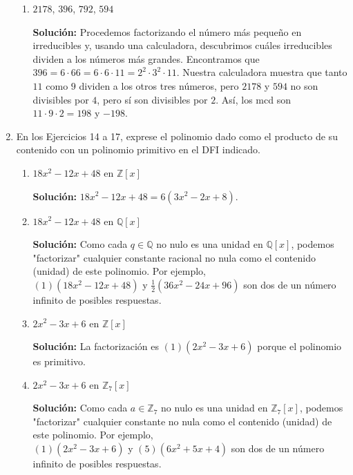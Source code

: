 \begin{enumerate}
\begin{enumerate}
        \item $2178$, $396$, $792$, $594$
        
        \textbf{Solución:} Procedemos factorizando el número más pequeño en irreducibles y, usando una calculadora, descubrimos cuáles irreducibles dividen a los números más grandes. Encontramos que $396 = 6 \cdot 66 = 6 \cdot 6 \cdot 11 = 2^2 \cdot 3^2 \cdot 11$. Nuestra calculadora muestra que tanto $11$ como $9$ dividen a los otros tres números, pero $2178$ y $594$ no son divisibles por $4$, pero sí son divisibles por $2$. Así, los mcd son $11 \cdot 9 \cdot 2 = 198$ y $-198$.
    \end{enumerate}

    \item En los Ejercicios 14 a 17, exprese el polinomio dado como el producto de su contenido con un polinomio primitivo en el DFI indicado.
    \begin{enumerate}
        \item $18x^2 - 12x + 48$ en $\mathbb{Z}[x]$
        
        \textbf{Solución:} $18x^2 - 12x + 48 = 6(3x^2 - 2x + 8)$.

        \item $18x^2 - 12x + 48$ en $\mathbb{Q}[x]$
        
        \textbf{Solución:} Como cada $q \in \mathbb{Q}$ no nulo es una unidad en $\mathbb{Q}[x]$, podemos "factorizar" cualquier constante racional no nula como el contenido (unidad) de este polinomio. Por ejemplo,\\
        $(1)(18x^2 - 12x + 48)$ y $\frac{1}{2}(36x^2 - 24x + 96)$ son dos de un número infinito de posibles respuestas.

        \item $2x^2 - 3x + 6$ en $\mathbb{Z}[x]$
        
        \textbf{Solución:} La factorización es $(1)(2x^2 - 3x + 6)$ porque el polinomio es primitivo.

        \item $2x^2 - 3x + 6$ en $\mathbb{Z}_7[x]$
        
        \textbf{Solución:} Como cada $a \in \mathbb{Z}_7$ no nulo es una unidad en $\mathbb{Z}_7[x]$, podemos "factorizar" cualquier constante no nula como el contenido (unidad) de este polinomio. Por ejemplo,\\
        $(1)(2x^2 - 3x + 6)$ y $(5)(6x^2 + 5x + 4)$ son dos de un número infinito de posibles respuestas.
    \end{enumerate}
\end{enumerate}
     
